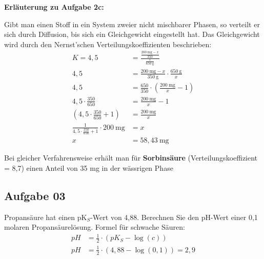 \documentclass[a4paper,10pt]{article}
\begin{document}
\textbf{Erläuterung zu Aufgabe 2c:} \par 
Gibt man einen Stoff in ein System zweier nicht mischbarer Phasen, so verteilt er sich durch Diffusion,
bis sich ein Gleichgewicht eingestellt hat. Das Gleichgewicht wird durch den Nernst’schen
Verteilungskoeffizienten beschrieben:
\pp
\begin{align*}
K= 4,5 &= \frac{\frac{200~\text{mg}-x}{350}}{\frac{x}{650~\text{g}}} \\
4,5 &= \frac{200~\text{mg}-x}{350~\text{g}} \cdot \frac{650~\text{g}}{x}  \\
4,5 &= \frac{650}{350} \cdot (\frac{200~\text{mg}}{x}-1) \\ 
4,5 \cdot \frac{350}{650} &= \frac{200~\text{mg}}{x} -1 \\
(4,5 \cdot \frac{350}{650}+1) &= \frac{200~\text{mg}}{x} \\
\frac{1}{4,5 \cdot \frac{350}{650} + 1} \cdot 200 ~\text{mg} &= x  \\
x &= 58,43  ~\text{mg}
\end{align*}

Bei gleicher Verfahrensweise erhält man für \textbf{Sorbinsäure} (Verteilungskoeffizient = 8,7) einen Anteil von 35 mg in der wässrigen Phase
\subsection*{Aufgabe 03}
Propansäure hat einen pK$_S$-Wert von 4,88. Berechnen Sie den pH-Wert einer 0,1 molaren
Propansäurelösung.
\pp
Formel für schwache Säuren:
\begin{align*}
pH &= \frac{1}{2} \cdot (pK_S - \log(c)) \\
pH &= \frac{1}{2} \cdot (4,88 - \log(0,1)) = 2,9
\end{align*}


\pagebreak
\end{document}
